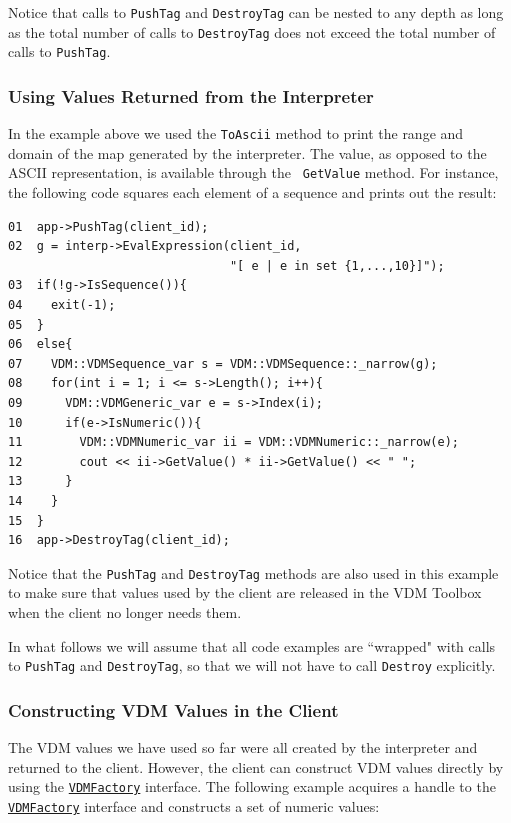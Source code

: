 \documentclass[\pformat,12pt]{article}
\newcommand{\VDMFactory}{\hyperlink{interface.VDMFactory}{VDMFactory}}
\begin{document}
Notice that calls to {\tt PushTag} and {\tt DestroyTag} can be nested
to any depth as long as the total number of calls to {\tt DestroyTag}
does not exceed the total number of calls to {\tt PushTag}. 

\subsubsection{Using Values Returned from the Interpreter}

In the example above we used the {\tt ToAscii} method to print the range
and domain of the map generated by the interpreter. The value, as
opposed to the ASCII representation, is available through the {\tt
  GetValue} method. For instance, the following code squares each
element of a sequence and prints out the result: 

\begin{verbatim}
01  app->PushTag(client_id);
02  g = interp->EvalExpression(client_id, 
                               "[ e | e in set {1,...,10}]");
03  if(!g->IsSequence()){
04    exit(-1);
05  }
06  else{
07    VDM::VDMSequence_var s = VDM::VDMSequence::_narrow(g);
08    for(int i = 1; i <= s->Length(); i++){
09      VDM::VDMGeneric_var e = s->Index(i);
10      if(e->IsNumeric()){
11        VDM::VDMNumeric_var ii = VDM::VDMNumeric::_narrow(e);
12        cout << ii->GetValue() * ii->GetValue() << " ";
13      }
14    }
15  }
16  app->DestroyTag(client_id);
\end{verbatim}

Notice that the  {\tt PushTag} and {\tt DestroyTag} methods are also
used in this example to make sure that values used by the client are
released in the VDM Toolbox when the client no longer needs them.  

In what follows we will assume that all code examples are ``wrapped"
with calls to {\tt PushTag} and {\tt DestroyTag}, so that we will not
have to call {\tt Destroy} explicitly.

\subsubsection{Constructing VDM Values in the Client}

The VDM values we have used so far were all created by the interpreter
and returned to the client. However, the client can construct VDM
values directly by using the {\tt \VDMFactory} interface. The following
example acquires a handle to the {\tt \VDMFactory} interface and constructs a
set of numeric values:
\end{document}

